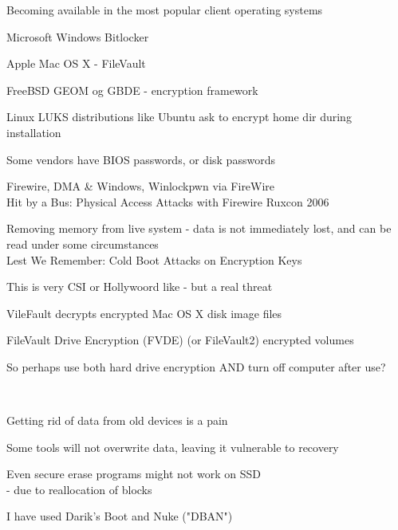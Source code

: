 \documentclass[Screen16to9,17pt]{foils}
\begin{document}


\begin{list1}
\item Becoming available in the most popular client operating systems
\begin{list2}
\item Microsoft Windows Bitlocker
\item Apple Mac OS X - FileVault
\item FreeBSD GEOM og GBDE - encryption framework
\item Linux LUKS distributions like Ubuntu ask to encrypt home dir during installation
\item Some vendors have BIOS passwords, or disk passwords
\end{list2}
\end{list1}



\begin{list2}
\item Firewire, DMA \& Windows, Winlockpwn via FireWire\\
Hit by a Bus: Physical Access Attacks with Firewire Ruxcon 2006
\item Removing memory from live system - data is not immediately lost, and can be read under some circumstances\\
Lest We Remember: Cold Boot Attacks on Encryption Keys\\
\item This is very CSI or Hollywoord like - but a real threat
\item VileFault decrypts encrypted Mac OS X disk image files\\ 
\item  FileVault Drive Encryption (FVDE) (or FileVault2) encrypted volumes\\
\end{list2}

\centerline{So perhaps use both hard drive encryption AND turn off computer after use?}


{~}

\begin{list1}
\item Getting rid of data from old devices is a pain
\item Some tools will not overwrite data, leaving it vulnerable to recovery
\item Even secure erase programs might not work on SSD\\
 - due to reallocation of blocks
\item I have used Darik's Boot and Nuke ("DBAN")\\
\end{list1}
\end{document}
